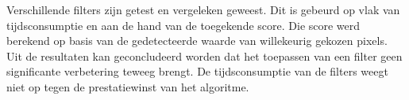 Verschillende filters zijn getest en vergeleken geweest. Dit is gebeurd op vlak van tijdsconsumptie en aan de hand van de toegekende score. Die score werd berekend op basis van de gedetecteerde waarde van willekeurig gekozen pixels. Uit de resultaten kan geconcludeerd worden dat het toepassen van een filter geen significante verbetering teweeg brengt. De tijdsconsumptie van de filters weegt niet op tegen de prestatiewinst van het algoritme.